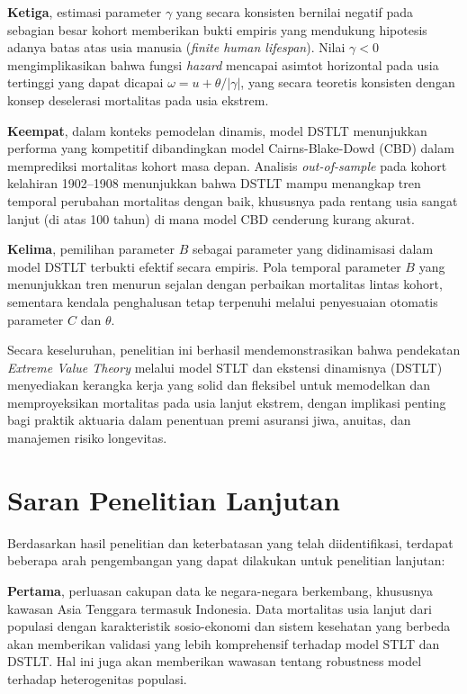 \textbf{Ketiga}, estimasi parameter $\gamma$ yang secara konsisten bernilai negatif pada sebagian besar kohort memberikan bukti empiris yang mendukung hipotesis adanya batas atas usia manusia (\textit{finite human lifespan}). Nilai $\gamma < 0$ mengimplikasikan bahwa fungsi \textit{hazard} mencapai asimtot horizontal pada usia tertinggi yang dapat dicapai $\omega = u + \theta/|\gamma|$, yang secara teoretis konsisten dengan konsep deselerasi mortalitas pada usia ekstrem.

\textbf{Keempat}, dalam konteks pemodelan dinamis, model DSTLT menunjukkan performa yang kompetitif dibandingkan model Cairns-Blake-Dowd (CBD) dalam memprediksi mortalitas kohort masa depan. Analisis \textit{out-of-sample} pada kohort kelahiran 1902--1908 menunjukkan bahwa DSTLT mampu menangkap tren temporal perubahan mortalitas dengan baik, khususnya pada rentang usia sangat lanjut (di atas 100 tahun) di mana model CBD cenderung kurang akurat.

\textbf{Kelima}, pemilihan parameter $B$ sebagai parameter yang didinamisasi dalam model DSTLT terbukti efektif secara empiris. Pola temporal parameter $B$ yang menunjukkan tren menurun sejalan dengan perbaikan mortalitas lintas kohort, sementara kendala penghalusan tetap terpenuhi melalui penyesuaian otomatis parameter $C$ dan $\theta$.

Secara keseluruhan, penelitian ini berhasil mendemonstrasikan bahwa pendekatan \textit{Extreme Value Theory} melalui model STLT dan ekstensi dinamisnya (DSTLT) menyediakan kerangka kerja yang solid dan fleksibel untuk memodelkan dan memproyeksikan mortalitas pada usia lanjut ekstrem, dengan implikasi penting bagi praktik aktuaria dalam penentuan premi asuransi jiwa, anuitas, dan manajemen risiko longevitas.

\section{Saran Penelitian Lanjutan}

Berdasarkan hasil penelitian dan keterbatasan yang telah diidentifikasi, terdapat beberapa arah pengembangan yang dapat dilakukan untuk penelitian lanjutan:

\textbf{Pertama}, perluasan cakupan data ke negara-negara berkembang, khususnya kawasan Asia Tenggara termasuk Indonesia. Data mortalitas usia lanjut dari populasi dengan karakteristik sosio-ekonomi dan sistem kesehatan yang berbeda akan memberikan validasi yang lebih komprehensif terhadap model STLT dan DSTLT. Hal ini juga akan memberikan wawasan tentang robustness model terhadap heterogenitas populasi.

